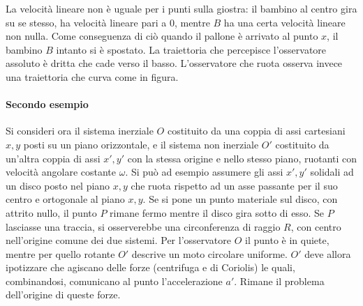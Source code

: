 \documentclass[10pt,a4paper]{book}
\begin{document}
\begin{figure}[htpb]
\end{figure}
\FloatBarrier
La velocità lineare non è uguale per i punti sulla giostra: il bambino al centro gira su se stesso, ha velocità lineare pari a $0$, mentre $B$ ha una certa velocità lineare non nulla. Come conseguenza di ciò quando il pallone è arrivato al punto $x$, il bambino $B$ intanto si è spostato. La traiettoria che percepisce l'osservatore assoluto è dritta che cade verso il basso. L'osservatore che ruota osserva invece una traiettoria che curva come in figura.

\paragraph{Secondo esempio} Si consideri ora il sistema inerziale $O$ costituito da una coppia di assi cartesiani $x, y$ posti su un piano orizzontale, e il sistema non inerziale $O'$ costituito da un'altra coppia di assi $x', y'$ con la stessa origine e nello stesso piano, ruotanti con velocità angolare costante $\omega$. Si può ad esempio assumere gli assi $x', y'$ solidali ad un disco posto nel piano $x, y$ che ruota rispetto ad un asse passante per il suo centro e ortogonale al piano $x, y$. Se si pone un punto materiale sul disco, con attrito nullo, il punto $P$ rimane fermo mentre il disco gira sotto di esso. Se $P$ lasciasse una traccia, si osserverebbe una circonferenza di raggio $R$, con centro nell'origine comune dei due sistemi. Per l'osservatore $O$ il punto è in quiete, mentre per quello rotante $O'$ descrive un moto circolare uniforme. $O'$ deve allora ipotizzare che agiscano delle forze (centrifuga e di Coriolis) le quali, combinandosi, comunicano al punto l'accelerazione $a'$. Rimane il problema dell'origine di queste forze.
\end{document}
